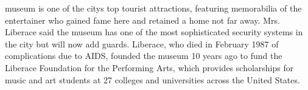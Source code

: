 \documentclass{article}
\begin{document}
\color[rgb]{0.9372549019607843,0.48627450980392156,0.396078431372549}museum is one of the citys top tourist attractions, featuring memorabilia of the entertainer who \color[rgb]{0.29411764705882354,0.3686274509803922,0.5058823529411764}gained fame here and retained a home not far away. Mrs. Liberace said the museum has one of the most sophisticated security \color[rgb]{0.40784313725490196,0.20784313725490197,0.03529411764705882}systems in the \color[rgb]{0.9372549019607843,0.48627450980392156,0.396078431372549}city but will now add \color[rgb]{0.29411764705882354,0.3686274509803922,0.5058823529411764}guards. Liberace, who died in February 1987 of complications due to \color[rgb]{0.40784313725490196,0.20784313725490197,0.03529411764705882}AIDS, \color[rgb]{0.9372549019607843,0.48627450980392156,0.396078431372549}founded the museum 10 years ago to fund the Liberace Foundation for the Performing Arts, which provides scholarships for music and art students at 27 colleges and universities across the United States. 
\end{document}
